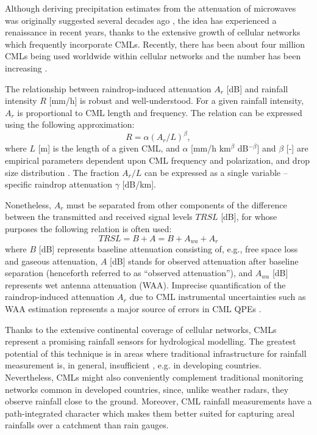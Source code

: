 \documentclass{ctuthesis}\usepackage[]{graphicx}\usepackage[]{color}
\begin{document}
Although deriving precipitation estimates from the attenuation of microwaves was originally suggested several decades ago \citep{atlasPathAreaIntegratedRainfall1977}, the idea has experienced a renaissance in recent years, thanks to the extensive growth of cellular networks \citep{messer2006environmental, leijnseRainfallMeasurementUsing2007} which frequently incorporate CMLs. Recently, there has been about four million CMLs being used worldwide within cellular networks and the number has been increasing \citep{ericssonEricssonMicrowaveOutlook2016}.

The relationship between raindrop-induced attenuation $A_r$ [dB] and rainfall intensity $R$ [mm/h] is robust and well-understood. For a given rainfall intensity, $A_r$ is proportional to CML length and frequency. The relation can be expressed using the following approximation:
        \begin{equation} \label{eq:2eq1}
        R = \alpha (A_r / L)^\beta,
        \end{equation}
where $L$ [m] is the length of a given CML, and $\alpha$ [mm/h km$^\beta$ dB$^{-\beta}$] and $\beta$ [-] are empirical parameters dependent upon CML frequency and polarization, and drop size distribution \citep{olsenARbRelationCalculation1978}. The fraction $A_r / L$ can be expressed as a single variable -- specific raindrop attenuation $\gamma$ [dB/km].

Nonetheless, $A_r$ must be separated from other components of the difference between the transmitted and received signal levels $T\!R\!S\!L$ [dB], for whose purposes the following relation is often used: 
        \begin{equation} \label{eq:2eq2}
        T\!R\!S\!L = B + A = B + A_{wa} + A_r
        \end{equation}
where $B$ [dB] represents baseline attenuation consisting of, e.g., free space loss and gaseous attenuation, $A$ [dB] stands for observed attenuation after baseline separation (henceforth referred to as “observed attenuation”), and $A_{wa}$ [dB] represents wet antenna attenuation (WAA). Imprecise quantification of the raindrop-induced attenuation $A_r$ due to CML instrumental uncertainties such as WAA estimation represents a major source of errors in CML QPEs \citep[][more details in \ref{InstErr}]{chwalaCommercialMicrowaveLink2019}.


Thanks to the extensive continental coverage of cellular networks, CMLs represent a promising rainfall sensors for hydrological modelling. The greatest potential of this technique is in areas where traditional infrastructure for rainfall measurement is, in general, insufficient \citep{gossetImprovingRainfallMeasurement2016}, e.g. in developing countries. Nevertheless, CMLs might also conveniently complement traditional monitoring networks common in developed countries, since, unlike weather radars, they observe rainfall close to the ground. Moreover, CML rainfall measurements have a path-integrated character which makes them better suited for capturing areal rainfalls over a catchment than rain gauges. 
\end{document}
